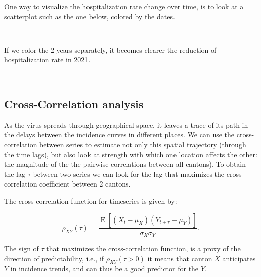 \documentclass[11pt]{article}
\begin{document}
One way to visualize the hospitalization rate change over time, is to
look at a scatterplot such as the one below, colored by the dates.

    \begin{center}
    \end{center}
    { \hspace*{\fill} \\}
    
    If we color the 2 years separately, it becomes clearer the reduction of
hospitalization rate in 2021.

    \begin{center}
    \end{center}
    { \hspace*{\fill} \\}
    
    \hypertarget{cross-correlation-analysis}{%
\subsection{Cross-Correlation analysis}\label{cross-correlation-analysis}}

As the virus spreads through geographical space, it leaves a trace of
its path in the delays between the incidence curves in different places.
We can use the cross-correlation between series to estimate not only
this spatial trajectory (through the time lags), but also look at
strength with which one location affects the other: the magnitude of the
the pairwise correlations between all cantons). To obtain the lag
\(\tau\) between two series we can look for the lag that maximizes the
cross-correlation coefficient between 2 cantons.

The cross-correlation function for timeseries is given by:

\[\rho_{XY}(\tau)={\frac {\operatorname{E} \left[\left(X_{t}-\mu _{X}\right){\overline {\left(Y_{t+\tau }-\mu _{Y}\right)}}\right]}{\sigma _{X}\sigma _{Y}}}.\]

The sign of \(\tau\) that maximizes the cross-correlation function, is a
proxy of the direction of predictability, i.e., if \(\rho_{XY}(\tau>0)\)
it means that canton \(X\) anticipates \(Y\) in incidence trends, and
can thus be a good predictor for the \(Y\).
\end{document}
